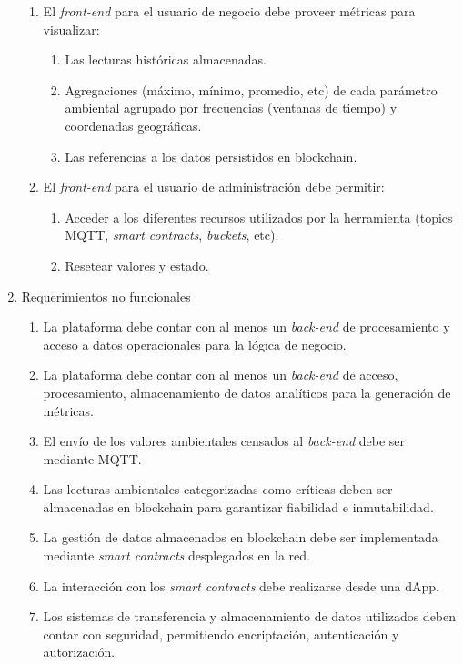 \begin{enumerate}
\begin{enumerate}
		\item El \textit{front-end} para el usuario de negocio debe proveer métricas para visualizar:
			\begin{enumerate}				
				\item Las lecturas históricas almacenadas.				
				\item Agregaciones (máximo, mínimo, promedio, etc) de cada parámetro ambiental agrupado por frecuencias (ventanas de tiempo) y coordenadas geográficas.				
				\item Las referencias a los datos persistidos en blockchain.
			\end{enumerate}			
		\item El \textit{front-end} para el usuario de administración debe permitir:
			\begin{enumerate}				
				\item Acceder a los diferentes recursos utilizados por la herramienta (topics MQTT, \textit{smart contracts}, \textit{buckets}, etc).
				\item Resetear valores y estado.			
			\end{enumerate}			
		\end{enumerate}	

					
	\item Requerimientos no funcionales		
	\begin{enumerate}	
		\item La plataforma debe contar con al menos un \textit{back-end} de procesamiento y acceso a datos operacionales para la lógica de negocio.
		\item La plataforma debe contar con al menos un \textit{back-end} de acceso, procesamiento, almacenamiento de datos analíticos para la generación de métricas.		
		\item El envío de los valores ambientales censados al \textit{back-end} debe ser mediante MQTT.
		\item Las lecturas ambientales categorizadas como críticas deben ser almacenadas en blockchain para garantizar fiabilidad e inmutabilidad.
		\item La gestión de datos almacenados en blockchain debe ser implementada mediante \textit{smart contracts} desplegados en la red.
		\item La interacción con los \textit{smart contracts} debe realizarse desde una dApp.
		\item Los sistemas de transferencia y almacenamiento de datos utilizados deben contar con seguridad, permitiendo encriptación, autenticación y autorización.	
		\end{enumerate}	
		

\end{enumerate}
